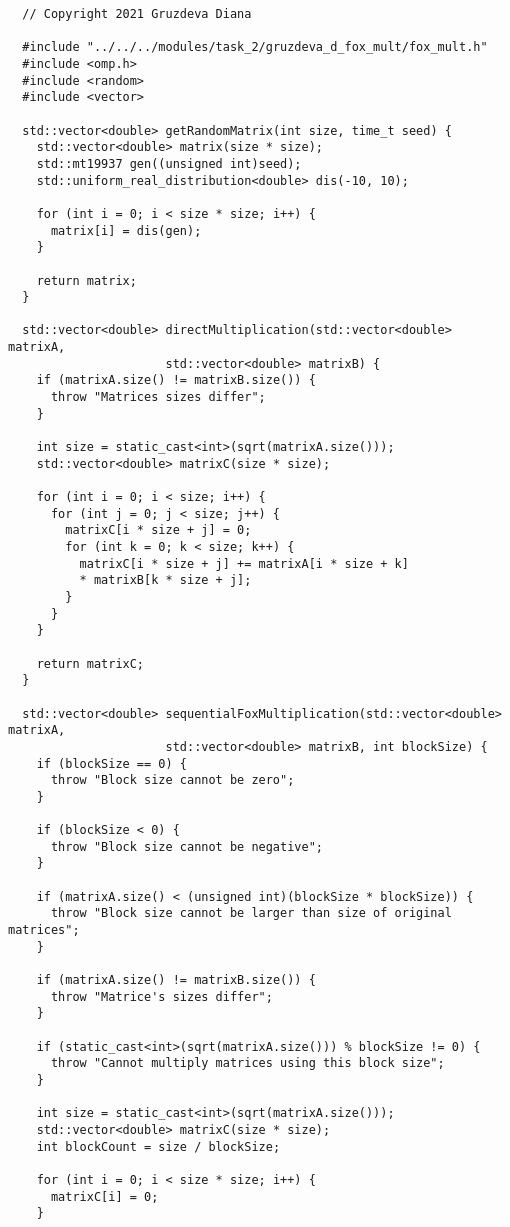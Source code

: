 \documentclass{article}
\begin{document}
\begin{lstlisting}
  // Copyright 2021 Gruzdeva Diana

  #include "../../../modules/task_2/gruzdeva_d_fox_mult/fox_mult.h"
  #include <omp.h>
  #include <random>
  #include <vector>

  std::vector<double> getRandomMatrix(int size, time_t seed) {
    std::vector<double> matrix(size * size);
    std::mt19937 gen((unsigned int)seed);
    std::uniform_real_distribution<double> dis(-10, 10);

    for (int i = 0; i < size * size; i++) {
      matrix[i] = dis(gen);
    }

    return matrix;
  }

  std::vector<double> directMultiplication(std::vector<double> matrixA,
                      std::vector<double> matrixB) {
    if (matrixA.size() != matrixB.size()) {
      throw "Matrices sizes differ";
    }

    int size = static_cast<int>(sqrt(matrixA.size()));
    std::vector<double> matrixC(size * size);

    for (int i = 0; i < size; i++) {
      for (int j = 0; j < size; j++) {
        matrixC[i * size + j] = 0;
        for (int k = 0; k < size; k++) {
          matrixC[i * size + j] += matrixA[i * size + k]
          * matrixB[k * size + j];
        }
      }
    }

    return matrixC;
  }

  std::vector<double> sequentialFoxMultiplication(std::vector<double> matrixA,
                      std::vector<double> matrixB, int blockSize) {
    if (blockSize == 0) {
      throw "Block size cannot be zero";
    }

    if (blockSize < 0) {
      throw "Block size cannot be negative";
    }

    if (matrixA.size() < (unsigned int)(blockSize * blockSize)) {
      throw "Block size cannot be larger than size of original matrices";
    }

    if (matrixA.size() != matrixB.size()) {
      throw "Matrice's sizes differ";
    }

    if (static_cast<int>(sqrt(matrixA.size())) % blockSize != 0) {
      throw "Cannot multiply matrices using this block size";
    }

    int size = static_cast<int>(sqrt(matrixA.size()));
    std::vector<double> matrixC(size * size);
    int blockCount = size / blockSize;

    for (int i = 0; i < size * size; i++) {
      matrixC[i] = 0;
    }


\end{lstlisting}
\end{document}
